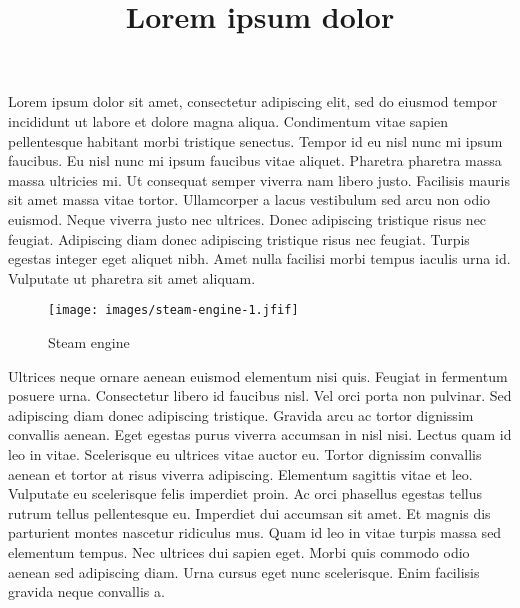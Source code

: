 \documentclass[
  letterpaper,
  DIV=11,
  numbers=noendperiod]{scrartcl}
\title{Lorem ipsum dolor}
\author{}
\date{}
\begin{document}
\maketitle
\ifdefined\Shaded\renewenvironment{Shaded}{\begin{tcolorbox}[borderline west={3pt}{0pt}{shadecolor}, enhanced, boxrule=0pt, sharp corners, frame hidden, breakable, interior hidden]}{\end{tcolorbox}}\fi

Lorem ipsum dolor sit amet, consectetur adipiscing elit, sed do eiusmod
tempor incididunt ut labore et dolore magna aliqua. Condimentum vitae
sapien pellentesque habitant morbi tristique senectus. Tempor id eu nisl
nunc mi ipsum faucibus. Eu nisl nunc mi ipsum faucibus vitae aliquet.
Pharetra pharetra massa massa ultricies mi. Ut consequat semper viverra
nam libero justo. Facilisis mauris sit amet massa vitae tortor.
Ullamcorper a lacus vestibulum sed arcu non odio euismod. Neque viverra
justo nec ultrices. Donec adipiscing tristique risus nec feugiat.
Adipiscing diam donec adipiscing tristique risus nec feugiat. Turpis
egestas integer eget aliquet nibh. Amet nulla facilisi morbi tempus
iaculis urna id. Vulputate ut pharetra sit amet aliquam.

\begin{figure}

{\centering \texttt{[image: images/steam-engine-1.jfif]}

}

\caption{Steam engine}

\end{figure}

Ultrices neque ornare aenean euismod elementum nisi quis. Feugiat in
fermentum posuere urna. Consectetur libero id faucibus nisl. Vel orci
porta non pulvinar. Sed adipiscing diam donec adipiscing tristique.
Gravida arcu ac tortor dignissim convallis aenean. Eget egestas purus
viverra accumsan in nisl nisi. Lectus quam id leo in vitae. Scelerisque
eu ultrices vitae auctor eu. Tortor dignissim convallis aenean et tortor
at risus viverra adipiscing. Elementum sagittis vitae et leo. Vulputate
eu scelerisque felis imperdiet proin. Ac orci phasellus egestas tellus
rutrum tellus pellentesque eu. Imperdiet dui accumsan sit amet. Et
magnis dis parturient montes nascetur ridiculus mus. Quam id leo in
vitae turpis massa sed elementum tempus. Nec ultrices dui sapien eget.
Morbi quis commodo odio aenean sed adipiscing diam. Urna cursus eget
nunc scelerisque. Enim facilisis gravida neque convallis a.
\end{document}
